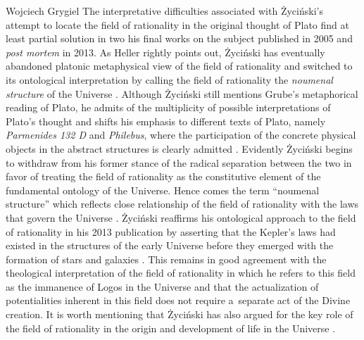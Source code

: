 \begin{artengenv}{Wojciech Grygiel}
The interpretative difficulties associated with Życiński's attempt to locate the field of rationality in the original thought of Plato find at least partial solution in two his final works on the subject published in 2005 and \textit{post mortem} in 2013. As Heller rightly points out, Życiński has eventually abandoned platonic metaphysical view of the field of rationality and switched to its ontological interpretation by calling the field of rationality the \textit{noumenal structure} of the Universe
\parencite[][p.442]{heller_field_2014}. %
 Although Życiński still mentions Grube's metaphorical reading of Plato, he admits of the multiplicity of possible interpretations of Plato's thought and shifts his emphasis to different texts of Plato, namely \textit{Parmenides 132 D} and \textit{Philebus}, where the participation of the concrete physical objects in the abstract structures is clearly admitted 
\parencite[][p.58]{zycinski_pole_2006}. %
 Evidently Życiński begins to withdraw from his former stance of the radical separation between the two in favor of treating the field of rationality as the constitutive element of the fundamental ontology of the Universe. Hence comes the term ``noumenal structure'' which reflects close relationship of the field of rationality with the laws that govern the Universe 
\parencite[][pp.58–59]{zycinski_pole_2006}. %
 Życiński reaffirms his ontological approach to the field of rationality in his 2013 publication by asserting that the Kepler's laws had existed in the structures of the early Universe before they emerged with the formation of stars and galaxies 
\parencite[][p.161]{zycinski_swiat_2013}. %
 This remains in good agreement with the theological interpretation of the field of rationality in which he refers to this field as the immanence of Logos in the Universe 
\parencites[][]{zycinski_pole_2006}[][pp.170–172]{zycinski_swiat_2013} %
 and that the actualization of potentialities inherent in this field does not require a~separate act of the Divine creation. It is worth mentioning that Życiński has also argued for the key role of the field of rationality in the origin and development of life in the Universe 
\parencite[][]{zycinski_wszechswiat_2009}.%



\end{artengenv}

